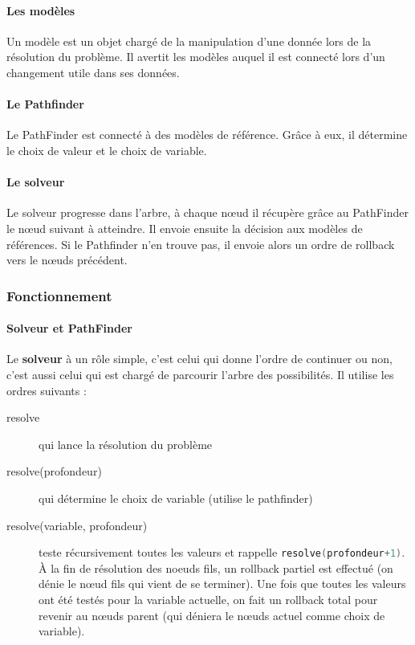 \paragraph{Les modèles}

Un modèle est un objet chargé de la manipulation d'une donnée lors de la résolution du problème. Il avertit les modèles auquel il est connecté lors d'un changement utile dans ses données.

\paragraph{Le Pathfinder}

Le PathFinder est connecté à des modèles de référence. Grâce à eux, il détermine le choix de valeur et le choix de variable.

\paragraph{Le solveur}

Le solveur progresse dans l'arbre, à chaque n\oe ud il récupère grâce au PathFinder le n\oe ud suivant à atteindre. Il envoie ensuite la décision aux modèles de références. Si le Pathfinder n'en trouve pas, il envoie alors un ordre de rollback vers le n\oe uds précédent.
\newpage

\subsubsection{Fonctionnement}

\paragraph{Solveur et PathFinder}

Le \textbf{solveur} à un rôle simple, c'est celui qui donne l'ordre de continuer ou non, c'est aussi celui qui est chargé de parcourir l'arbre des possibilités.
Il utilise les ordres suivants :

\begin{description}
	\item [resolve] qui lance la résolution du problème
	\item [resolve(profondeur)] qui détermine le choix de variable (utilise le pathfinder)
	\item [resolve(variable, profondeur)] teste récursivement toutes les valeurs et rappelle \lstinline[language=c++]|resolve(profondeur+1)|. \`{A} la fin de résolution des noeuds fils, un rollback partiel est effectué (on dénie le n\oe ud fils qui vient de se terminer).
	Une fois que toutes les valeurs ont été testés pour la variable actuelle, on fait un rollback total pour revenir au n\oe uds parent (qui déniera le n\oe uds actuel comme choix de variable).
\end{description}

